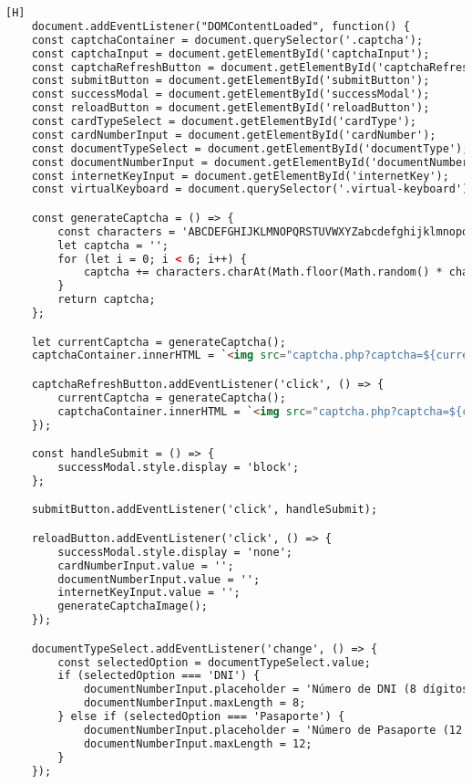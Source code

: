 \documentclass[14pt]{article}
\begin{document}
    \begin{lstlisting}[language=html,caption={Code Javasript}][H]
    document.addEventListener("DOMContentLoaded", function() {
    const captchaContainer = document.querySelector('.captcha');
    const captchaInput = document.getElementById('captchaInput');
    const captchaRefreshButton = document.getElementById('captchaRefreshButton');
    const submitButton = document.getElementById('submitButton');
    const successModal = document.getElementById('successModal');
    const reloadButton = document.getElementById('reloadButton');
    const cardTypeSelect = document.getElementById('cardType');
    const cardNumberInput = document.getElementById('cardNumber');
    const documentTypeSelect = document.getElementById('documentType');
    const documentNumberInput = document.getElementById('documentNumber');
    const internetKeyInput = document.getElementById('internetKey');
    const virtualKeyboard = document.querySelector('.virtual-keyboard');

    const generateCaptcha = () => {
        const characters = 'ABCDEFGHIJKLMNOPQRSTUVWXYZabcdefghijklmnopqrstuvwxyz0123456789';
        let captcha = '';
        for (let i = 0; i < 6; i++) {
            captcha += characters.charAt(Math.floor(Math.random() * characters.length));
        }
        return captcha;
    };

    let currentCaptcha = generateCaptcha();
    captchaContainer.innerHTML = `<img src="captcha.php?captcha=${currentCaptcha}" alt="Captcha">${currentCaptcha}`;

    captchaRefreshButton.addEventListener('click', () => {
        currentCaptcha = generateCaptcha();
        captchaContainer.innerHTML = `<img src="captcha.php?captcha=${currentCaptcha}" alt="Captcha">${currentCaptcha}`;
    });

    const handleSubmit = () => {
        successModal.style.display = 'block';
    };

    submitButton.addEventListener('click', handleSubmit);

    reloadButton.addEventListener('click', () => {
        successModal.style.display = 'none';
        cardNumberInput.value = '';
        documentNumberInput.value = '';
        internetKeyInput.value = '';
        generateCaptchaImage();
    });

    documentTypeSelect.addEventListener('change', () => {
        const selectedOption = documentTypeSelect.value;
        if (selectedOption === 'DNI') {
            documentNumberInput.placeholder = 'Número de DNI (8 dígitos)';
            documentNumberInput.maxLength = 8;
        } else if (selectedOption === 'Pasaporte') {
            documentNumberInput.placeholder = 'Número de Pasaporte (12 dígitos)';
            documentNumberInput.maxLength = 12;
        }
    });


\end{lstlisting}
\end{document}
